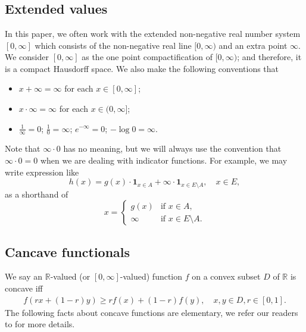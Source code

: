 \documentclass[12pt,a4paper]{amsart}
\numberwithin{equation}{section}
\theoremstyle{plain}
\theoremstyle{definition}
\theoremstyle{remark}
\newcounter{N}
\newcounter{n}[N]
\begin{document}
\appendix
\section{}
\subsection{Extended values}
\label{sec:EV}
In this paper, we often work with the extended non-negative real number system $[0,\infty]$ which consists of the non-negative real line $[0,\infty)$ and an extra point $\infty$.
We consider $[0,\infty]$ as the one point compactification of $[0,\infty)$; and therefore, it is a compact Hausdorff space.
We also make the following conventions that
\begin{itemize}
\item
$x + \infty = \infty$ for each $x\in [0,\infty]$;
\item
$x \cdot \infty = \infty$ for each $x\in (0,\infty]$;
\item
$\frac{1}{\infty} = 0$; $\frac{1}{0} = \infty$; $e^{-\infty} =0$; $-\log 0 = \infty$.
\end{itemize}
Note that $ \infty \cdot 0$ has no meaning, but we will always use the convention that $\infty \cdot 0 = 0$ when we are dealing with indicator functions.
For example, we may write expression like
\begin{equation}
h(x) = g(x) \cdot \mathbf 1_{x\in A} + \infty \cdot \mathbf 1_{x \in E\setminus A}, \quad x\in E,
\end{equation}
as a shorthand of
\begin{equation}
x = \begin{cases}
g(x) & \text{if $x\in A$},
\\ \infty & \text{if $x\in E\setminus A$}.
\end{cases}
\end{equation}

\subsection{Cancave functionals}
We say an $\mathbb R$-valued (or $[0,\infty]$-valued) function $f$ on a convex subset $D$ of $\mathbb R$ is concave iff
\begin{align}
   f(rx+(1-r) y)
 \geq r f(x) + (1-r) f(y),
 \quad x,y \in D, r \in [0,1].
 \end{align}
The following facts about concave functions are elementary, we refer our readers to \cite[Chapter 6]{Dudley2002Real} for more details.
\end{document}
